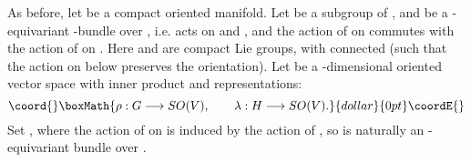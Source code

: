\documentclass[a4paper,12pt,reqno,sumlimits]{amsart}
\theoremstyle{plain}
\theoremstyle{definition}
\providecommand{\1}{{\bf 1}}
\renewcommand{\to}{\longrightarrow}
\numberwithin{equation}{section}
\begin{document}
As before, let \coordHE{} be a compact oriented manifold.  Let \coordHE{} be a subgroup of
\coordHE{}, and \coordHE{} be a \coordHE{}-equivariant \coordHE{}-bundle over \coordHE{}, i.e. \coordHE{} acts on \coordHE{}
and \coordHE{}, and the action of \coordHE{} on \coordHE{} commutes with the action of \coordHE{} on \coordHE{}.
Here \coordHE{} and \coordHE{} are compact Lie groups, with \coordHE{} connected (such that the
action on \coordHE{} below preserves the orientation).  Let \coordHE{} be a
\coordHE{}-dimensional oriented vector space with inner product and
representations:
$$\coord{}\boxMath{
\rho:G\to SO(V),\qquad\lambda:H\to SO(V).
}{dollar}{0pt}\coordE{}$$
Set \coordHE{}, where the action of \coordHE{} on \coordHE{} is induced by the
action of \coordHE{}, so \coordHE{} is naturally an \coordHE{}-equivariant bundle over \coordHE{}.
\end{document}

